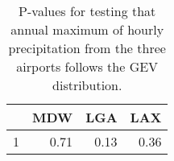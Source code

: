 \begin{table}[ht]
\centering
\begin{tabular}{rrrr}
  \hline
 & MDW & LGA & LAX \\ 
  \hline
1 & 0.71 & 0.13 & 0.36 \\ 
   \hline
\end{tabular}
\caption{P-values for testing that annual maximum of hourly 
            precipitation from the three airports follows the GEV distribution.} 
\end{table}

